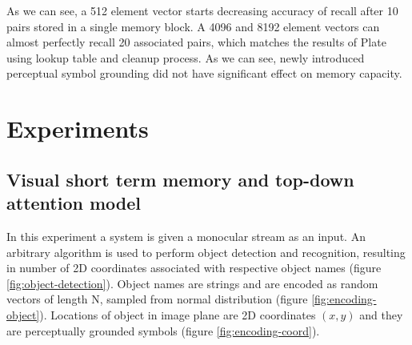 \documentclass[conference]{IEEEtran}
\begin{document}
	As we can see, a 512 element vector starts decreasing accuracy of recall after 10 pairs stored in a single memory block. A 4096 and 8192 element vectors can almost perfectly recall 20 associated pairs, which matches the results of Plate using lookup table and cleanup process. As we can see, newly introduced perceptual symbol grounding did not have significant effect on memory capacity.
	
	\section{Experiments}
	\label{sec:experiments}
	\subsection{Visual short term memory and top-down attention model}
	
	In this experiment a system is given a monocular stream as an input. An arbitrary algorithm is used to perform object detection and recognition, resulting in number of 2D coordinates associated with respective object names (figure \ref{fig:object-detection}). Object names are strings and are encoded as random vectors of length N, sampled from normal distribution (figure \ref{fig:encoding-object}). Locations of object in image plane are 2D coordinates $(x,y)$ and they are perceptually grounded symbols (figure \ref{fig:encoding-coord}).
	
\end{document}

